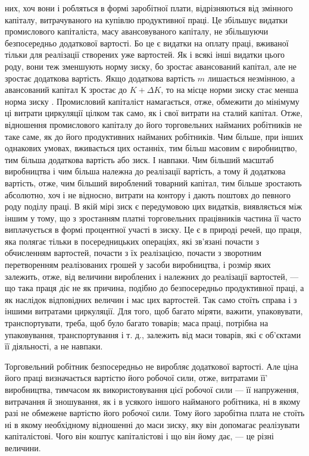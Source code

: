 \parcont{}  %
них, хоч вони і робляться в формі заробітної плати, відрізняються
від змінного капіталу, витрачуваного на купівлю продуктивної
праці. Це збільшує видатки промислового капіталіста, масу
авансовуваного капіталу, не збільшуючи безпосередньо додаткової
вартості. Бо це є видатки на оплату праці, вживаної тільки
для реалізації створених уже вартостей. Як і всякі інші видатки
цього роду, вони теж зменшують норму зиску, бо зростає авансований
капітал, але не зростає додаткова вартість. Якщо додаткова
вартість $m$ лишається незмінною, а авансований капітал $К$
зростає до $K + ΔK$, то на місце норми зиску  стає менша норма
зиску . Промисловий капіталіст намагається, отже, обмежити
до мінімуму ці витрати циркуляції цілком так само, як і
свої витрати на сталий капітал. Отже, відношення промислового
капіталу до його торговельних найманих робітників не таке саме,
як до його продуктивних найманих робітників. Чим більше, при
інших однакових умовах, вживається цих останніх, тим більш
масовим є виробництво, тим більша додаткова вартість або зиск.
І навпаки. Чим більший масштаб виробництва і чим більша належна
до реалізації вартість, а тому й додаткова вартість, отже,
чим більший вироблений товарний капітал, тим більше зростають
абсолютно, хоч і не відносно, витрати на контору і дають поштовх
до певного роду поділу праці. В якій мірі зиск є передумовою
цих видатків, виявляється між іншим у тому, що з зростанням
платні торговельних працівників частина її часто виплачується
в формі процентної участі в зиску. Це є в природі
речей, що праця, яка полягає тільки в посередницьких операціях,
які зв’язані почасти з обчисленням вартостей, почасти з їх реалізацією,
почасти з зворотним перетворенням реалізованих грошей
у засоби виробництва, і розмір яких залежить, отже, від
величини вироблених і належних до реалізації вартостей, — що
така праця діє не як причина, подібно до безпосередньо продуктивної
праці, а як наслідок відповідних величин і мас цих вартостей.
Так само стоїть справа і з іншими витратами циркуляції.
Для того, щоб багато міряти, важити, упаковувати, транспортувати,
треба, щоб було багато товарів; маса праці, потрібна на
упаковування, транспортування і т. д., залежить від маси товарів,
які є об’єктами її діяльності, а не навпаки.

Торговельний робітник безпосередньо не виробляє додаткової
вартості. Але ціна його праці визначається вартістю його
робочої сили, отже, витратами її' виробництва, тимчасом як
використовування цієї робочої сили — її напруження, витрачання
й зношування, як і в усякого іншого найманого робітника, ні в
якому разі не обмежене вартістю його робочої сили. Тому його
заробітна плата не стоїть ні в якому необхідному відношенні
до маси зиску, яку він допомагає реалізувати капіталістові. Чого
він коштує капіталістові і що він йому дає, — це різні величини.
\parbreak{}  %
